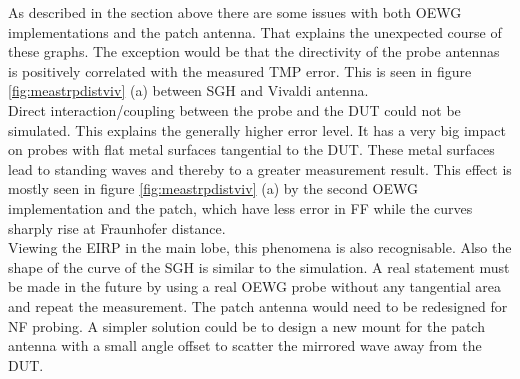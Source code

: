 As described in the section above there are some issues with both \ac{OEWG} implementations and the patch antenna. That explains the unexpected course of these graphs. The exception would be that the directivity of the probe antennas is positively correlated with the measured \ac{TMP} error. This is seen in figure \ref{fig:meastrpdistviv} (a) between \ac{SGH} and Vivaldi antenna.\\
Direct interaction/coupling between the probe and the \ac{DUT} could not be simulated. This explains the generally higher error level. It has a very big impact on probes with flat metal surfaces tangential to the \ac{DUT}. These metal surfaces lead to standing waves and thereby to a greater measurement result. This effect is mostly seen in figure \ref{fig:meastrpdistviv} (a) by the second \ac{OEWG} implementation and the patch, which have less error in \ac{FF} while the curves sharply rise at Fraunhofer distance.\\
Viewing the \ac{EIRP} in the main lobe, this phenomena is also recognisable. Also the shape of the curve of the \ac{SGH} is similar to the simulation. A real statement must be made in the future by using a real \ac{OEWG} probe without any tangential area and repeat the measurement. The patch antenna would need to be redesigned for \ac{NF} probing. A simpler solution could be to design a new mount for the patch antenna with a small angle offset to scatter the mirrored wave away from the \ac{DUT}.






